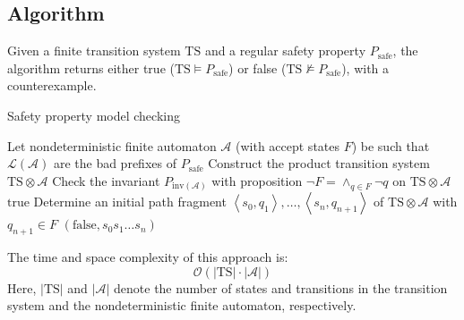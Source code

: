 \subsection{Algorithm}
Given a finite transition system $\text{TS}$ and a regular safety property $P_{\text{safe}}$, the algorithm returns either true ($\text{TS}\models P_{\text{safe}}$) or false ($\text{TS}\not\models P_{\text{safe}}$), with a counterexample. 
\begin{algorithm}[H]
    \caption{Safety property model checking}
        \begin{algorithmic}[1]
            \State Let nondeterministic finite automaton $\mathcal{A}$ (with accept states $F$) be such that $\mathcal{L}(\mathcal{A})$ are the bad prefixes of $P_{\text{safe}}$ 
            \State Construct the product transition system $\text{TS}\otimes\mathcal{A}$
            \State Check the invariant $P_{\text{inv}(\mathcal{A})}$ with proposition $\lnot F=\wedge_{q \in F}\lnot q$ on $\text{TS}\otimes\mathcal{A}$
                \State \Return $\text{true}$
            \Else 
                \State Determine an initial path fragment $\left\langle s_0,q_1\right\rangle,\dots,\left\langle s_n,q_{n+1}\right\rangle$ of $\text{TS}\otimes\mathcal{A}$ with $q_{n+1}\in F$
                \State \Return $(\text{false}, s_0s_1\dots s_n)$
            \EndIf
        \end{algorithmic}
\end{algorithm}
\noindent The time and space complexity of this approach is:
\[\mathcal{O}(\left\lvert\text{TS}\right\rvert\cdot\left\lvert\mathcal{A}\right\rvert)\]
Here, $\left\lvert\text{TS}\right\rvert$ and $\left\lvert\mathcal{A}\right\rvert$ denote the number of states and transitions in the transition system and the nondeterministic finite automaton, respectively.